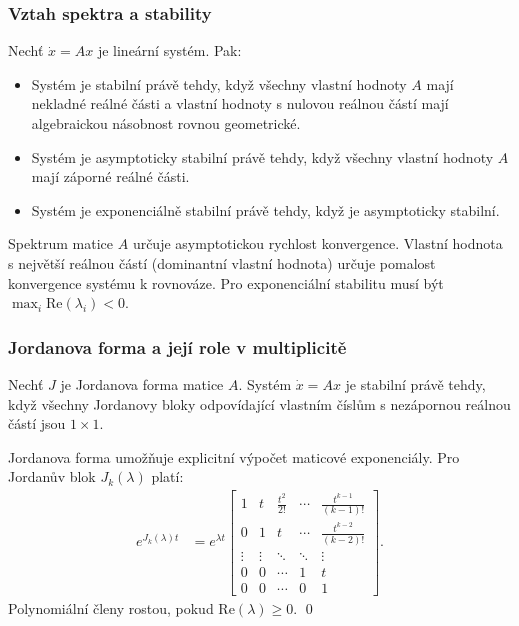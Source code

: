 \subsubsection{Vztah spektra a stability}

\begin{theorem}
Nechť $\dot{x} = Ax$ je lineární systém. Pak:
\begin{itemize}
\item Systém je stabilní právě tehdy, když všechny vlastní hodnoty $A$ mají nekladné reálné části a vlastní hodnoty s nulovou reálnou částí mají algebraickou násobnost rovnou geometrické.
\item Systém je asymptoticky stabilní právě tehdy, když všechny vlastní hodnoty $A$ mají záporné reálné části.
\item Systém je exponenciálně stabilní právě tehdy, když je asymptoticky stabilní.
\end{itemize}
\end{theorem}

\begin{keyinsight}
Spektrum matice $A$ určuje asymptotickou rychlost konvergence. Vlastní hodnota s největší reálnou částí (dominantní vlastní hodnota) určuje pomalost konvergence systému k rovnováze. Pro exponenciální stabilitu musí být $\max_i \mathrm{Re}(\lambda_i) < 0$.
\end{keyinsight}

\subsubsection{Jordanova forma a její role v multiplicitě}

\begin{theorem}
Nechť $J$ je Jordanova forma matice $A$. Systém $\dot{x} = Ax$ je stabilní právě tehdy, když všechny Jordanovy bloky odpovídající vlastním číslům s nezápornou reálnou částí jsou $1 \times 1$.
\end{theorem}

\begin{proofsketch}
Jordanova forma umožňuje explicitní výpočet maticové exponenciály. Pro Jordanův blok $J_k(\lambda)$ platí:
\begin{align*}
e^{J_k(\lambda)t} &= e^{\lambda t} \begin{bmatrix}
1 & t & \frac{t^2}{2!} & \cdots & \frac{t^{k-1}}{(k-1)!} \\
0 & 1 & t & \cdots & \frac{t^{k-2}}{(k-2)!} \\
\vdots & \vdots & \ddots & \ddots & \vdots \\
0 & 0 & \cdots & 1 & t \\
0 & 0 & \cdots & 0 & 1
\end{bmatrix}.
\end{align*}
Polynomiální členy rostou, pokud $\mathrm{Re}(\lambda) \geq 0$. \qed
\end{proofsketch}

